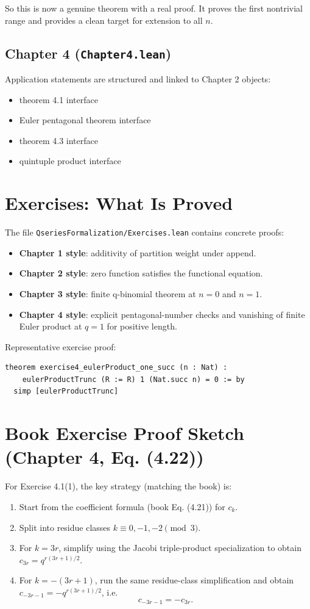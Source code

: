 \documentclass[11pt]{article}
\begin{document}
So this is now a genuine theorem with a real proof. It proves the first nontrivial range and provides a clean target for extension to all \(n\).

\subsection*{Chapter 4 (\texttt{Chapter4.lean})}
Application statements are structured and linked to Chapter 2 objects:
\begin{itemize}[leftmargin=1.2em]
  \item theorem 4.1 interface
  \item Euler pentagonal theorem interface
  \item theorem 4.3 interface
  \item quintuple product interface
\end{itemize}

\section{Exercises: What Is Proved}
The file \texttt{QseriesFormalization/Exercises.lean} contains concrete proofs:
\begin{itemize}[leftmargin=1.2em]
  \item \textbf{Chapter 1 style}: additivity of partition weight under append.
  \item \textbf{Chapter 2 style}: zero function satisfies the functional equation.
  \item \textbf{Chapter 3 style}: finite q-binomial theorem at \(n=0\) and \(n=1\).
  \item \textbf{Chapter 4 style}: explicit pentagonal-number checks and vanishing of finite Euler product at \(q=1\) for positive length.
\end{itemize}

Representative exercise proof:
\begin{lstlisting}
theorem exercise4_eulerProduct_one_succ (n : Nat) :
    eulerProductTrunc (R := R) 1 (Nat.succ n) = 0 := by
  simp [eulerProductTrunc]
\end{lstlisting}

\section{Book Exercise Proof Sketch (Chapter 4, Eq. (4.22))}
For Exercise 4.1(1), the key strategy (matching the book) is:
\begin{enumerate}[leftmargin=1.4em]
  \item Start from the coefficient formula (book Eq. (4.21)) for \(c_k\).
  \item Split into residue classes \(k \equiv 0, -1, -2 \pmod{3}\).
  \item For \(k=3r\), simplify using the Jacobi triple-product specialization to obtain
  \(c_{3r}=q^{r(3r+1)/2}\).
  \item For \(k=-(3r+1)\), run the same residue-class simplification and obtain
  \(c_{-3r-1}=-q^{r(3r+1)/2}\), i.e.
  \[
    c_{-3r-1}=-c_{3r}.
  \]
\end{enumerate}
\end{document}
